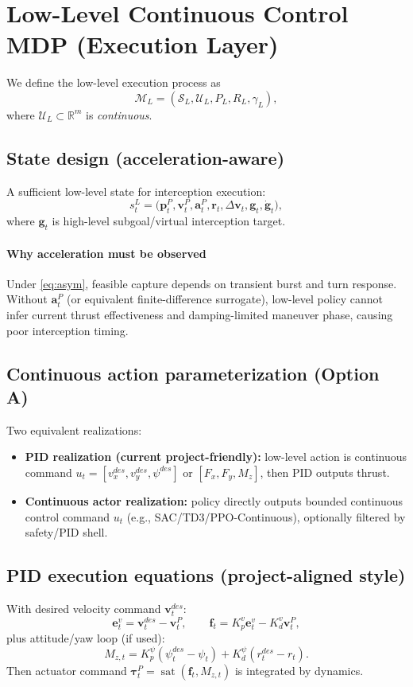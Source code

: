 \documentclass[11pt]{article}
\begin{document}
\section{Low-Level Continuous Control MDP (Execution Layer)}

We define the low-level execution process as
\[
\mathcal{M}_L=(\mathcal{S}_L,\mathcal{U}_L,P_L,R_L,\gamma_L),
\]
where \(\mathcal{U}_L\subset\mathbb{R}^m\) is \emph{continuous}.

\subsection{State design (acceleration-aware)}
A sufficient low-level state for interception execution:
\begin{equation}
s_t^L=\big(\bm{p}^P_t,\bm{v}^P_t,\bm{a}^P_t,\bm{r}_t,\Delta\bm{v}_t,\bm{g}_t,\dot{\bm{g}}_t\big),
\end{equation}
where \(\bm{g}_t\) is high-level subgoal/virtual interception target.

\paragraph{Why acceleration must be observed}
Under \eqref{eq:asym}, feasible capture depends on transient burst and turn response. Without \(\bm{a}^P_t\) (or equivalent finite-difference surrogate), low-level policy cannot infer current thrust effectiveness and damping-limited maneuver phase, causing poor interception timing.

\subsection{Continuous action parameterization (Option A)}
Two equivalent realizations:
\begin{itemize}
  \item \textbf{PID realization (current project-friendly):} low-level action is continuous command
  \(u_t=[v^{des}_x,v^{des}_y,\psi^{des}]\) or \([F_x,F_y,M_z]\), then PID outputs thrust.
  \item \textbf{Continuous actor realization:} policy directly outputs bounded continuous control command \(u_t\) (e.g., SAC/TD3/PPO-Continuous), optionally filtered by safety/PID shell.
\end{itemize}

\subsection{PID execution equations (project-aligned style)}
With desired velocity command \(\bm{v}^{des}_t\):
\begin{equation}
\bm{e}^v_t = \bm{v}^{des}_t - \bm{v}^P_t,
\qquad
\bm{f}_t = K_p^v\bm{e}^v_t - K_d^v\bm{v}^P_t,
\end{equation}
plus attitude/yaw loop (if used):
\begin{equation}
M_{z,t}=K_p^{\psi}(\psi^{des}_t-\psi_t)+K_d^{\psi}(r^{des}_t-r_t).
\end{equation}
Then actuator command
\(\bm{\tau}^P_t=\operatorname{sat}(\bm{f}_t,M_{z,t})\)
is integrated by dynamics.
\end{document}

